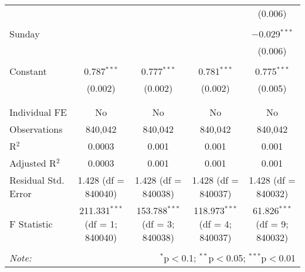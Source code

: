 \documentclass[
]{article}
\begin{document}
\begin{table}[!htbp]
{\begin{tabular}{@{\extracolsep{5pt}}lcccc}
  &  &  &  & (0.006) \\ 
  & & & & \\ 
 Sunday &  &  &  & $-$0.029$^{***}$ \\ 
  &  &  &  & (0.006) \\ 
  & & & & \\ 
 Constant & 0.787$^{***}$ & 0.777$^{***}$ & 0.781$^{***}$ & 0.775$^{***}$ \\ 
  & (0.002) & (0.002) & (0.002) & (0.005) \\ 
  & & & & \\ 
\hline \\[-1.8ex] 
Individual FE & No & No & No & No \\ 
Observations & 840,042 & 840,042 & 840,042 & 840,042 \\ 
R$^{2}$ & 0.0003 & 0.001 & 0.001 & 0.001 \\ 
Adjusted R$^{2}$ & 0.0003 & 0.001 & 0.001 & 0.001 \\ 
Residual Std. Error & 1.428 (df = 840040) & 1.428 (df = 840038) & 1.428 (df = 840037) & 1.428 (df = 840032) \\ 
F Statistic & 211.331$^{***}$ (df = 1; 840040) & 153.788$^{***}$ (df = 3; 840038) & 118.973$^{***}$ (df = 4; 840037) & 61.826$^{***}$ (df = 9; 840032) \\ 
\hline 
\hline \\[-1.8ex] 
\textit{Note:}  & \multicolumn{4}{r}{$^{*}$p$<$0.1; $^{**}$p$<$0.05; $^{***}$p$<$0.01} \\ 
\end{tabular}
} 
\end{table} 
\newpage
\end{document}

